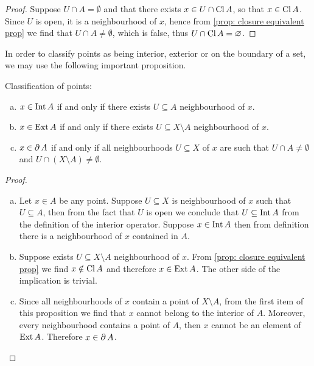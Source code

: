 \begin{proof}
    Suppose \(U \cap A = \emptyset\) and that there exists \(x \in U \cap
    \operatorname{Cl} A\), so that \(x \in \operatorname{Cl} A\). Since \(U\) is open, it
    is a neighbourhood of \(x\), hence from \cref{prop: closure equivalent prop}
    we find that \(U \cap A \neq \emptyset\), which is false, thus \(U \cap
    \operatorname{Cl} A = \varnothing\).
\end{proof}

In order to classify points as being interior, exterior or on the boundary of a
set, we may use the following important proposition.

\begin{proposition}
    \label{prop:classification-int-ext-boundary-points}
    Classification of points:
    \begin{enumerate}[(a)]\setlength\itemsep{0em}
        \item \(x \in \operatorname{Int} A\) if and only if there exists \(U \subseteq A\)
              neighbourhood of \(x\).

        \item \(x \in \operatorname{Ext} A\) if and only if there exists \(U \subseteq X \setminus A\)
              neighbourhood of \(x\).

        \item \(x \in \operatorname{\partial} A\) if and only if all neighbourhoods \(U \subseteq X\)
              of \(x\) are such that \(U \cap A \neq \emptyset\) and \(U \cap (X \setminus
              A) \neq \emptyset\).
    \end{enumerate}
\end{proposition}

\begin{proof}
    \begin{enumerate}[(a)]\setlength\itemsep{0em}
        \item Let \(x \in A\) be any point. Suppose \(U \subseteq X\) is neighbourhood
              of \(x\) such that \(U \subseteq A\), then from the fact that \(U\) is open we
              conclude that \(U \subseteq \operatorname{Int} A\) from the definition of the interior
              operator. Suppose \(x \in \operatorname{Int} A\) then from definition there is a
              neighbourhood of \(x\) contained in \(A\).

        \item Suppose exists \(U \subseteq X \setminus A\) neighbourhood of \(x\). From
              \cref{prop: closure equivalent prop} we find \(x \notin \operatorname{Cl} A\) and
              therefore \(x \in \operatorname{Ext} A\). The other side of the implication is trivial.

        \item Since all neighbourhoods of \(x\) contain a point of \(X \setminus A\),
              from the first item of this proposition we find that \(x\) cannot belong to
              the interior of \(A\). Moreover, every neighbourhood contains a point of
              \(A\), then \(x\) cannot be an element of \(\operatorname{Ext} A\). Therefore \(x \in
              \operatorname{\partial} A\).
    \end{enumerate}
\end{proof}

